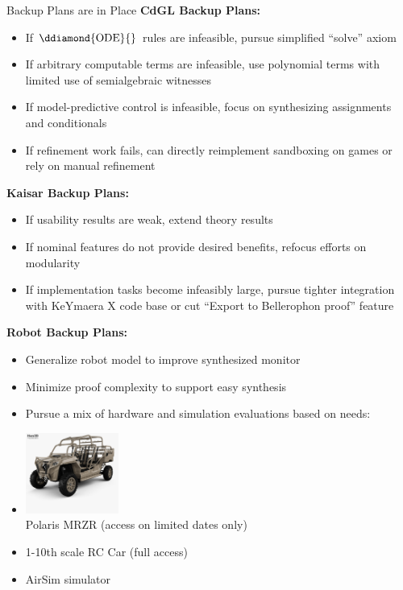 \documentclass[slidestop,aspectratio=169]{beamer}
\providecommand{\KeYmaeraX}{KeYmaera X\xspace}
\theoremstyle{plain}
\theoremstyle{definition}
\theoremstyle{remark}
\begin{document}
\begin{frame}[t,allowframebreaks]{Backup Plans are in Place}
\textbf{CdGL Backup Plans:}
\begin{itemize}
\item If $\ddiamond{\text{ODE}}{}$ rules are infeasible, pursue simplified ``solve'' axiom
\item If arbitrary computable terms are infeasible, use polynomial terms with limited use of semialgebraic witnesses
\item If model-predictive control is infeasible, focus on synthesizing assignments and conditionals
\item If refinement work fails, can directly reimplement sandboxing on games or rely on manual refinement
\end{itemize}
\framebreak
\textbf{Kaisar Backup Plans:}
\begin{itemize}
\item If usability results are weak, extend theory results
\item If nominal features do not provide desired benefits, refocus efforts on modularity
\item If implementation tasks become infeasibly large, pursue tighter integration with \KeYmaeraX code base or cut ``Export to Bellerophon proof'' feature
\end{itemize}
\framebreak

{\textbf{Robot Backup Plans:}
\begin{itemize}
\item Generalize robot model to improve synthesized monitor
\item Minimize proof complexity to support easy synthesis
\item Pursue a mix of hardware and simulation evaluations based on needs:
\item\includegraphics[width=1.2in]{img/mrzr.jpg}\\
Polaris MRZR (access on limited dates only)
\item 1-10th scale RC Car (full access)
\item AirSim simulator
\end{itemize}}
\end{frame}
\end{document}
